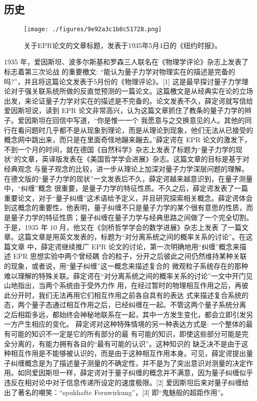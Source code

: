 \subsection{历史}
\begin{figure}[ht]
\centering
\texttt{[image: ./figures/9e92a3c1b8c51728.png]}
\caption{关于EPR论文的文章标题，发表于1935年5月4日的《纽约时报》。} \label{fig_LZJC_2}
\end{figure}
1935 年，爱因斯坦、波多尔斯基和罗森三人联名在《物理学评论》杂志上发表了标志着第三次论战 的重要檄文: “能认为量子力学对物理实在的描述是完备的吗?”，并且将这篇论文发表于5月份的《物理评论》。[1] 这是最早探讨量子力学理论对于强关联系统所做的反直觉预测的一篇论文。这篇檄文是从经典实在论的立场出发，来论证量子力学对实在的描述是不完备的。论文发表不久，薛定谔就写信给爱因斯坦说，读到 EPR 论文非常高兴，认为这篇文章抓住了教条的量子力学的辫子。爱因斯坦在回信中写道，“你是惟一一个 我愿意与之交换意见的人。其他的同行在看问题时几乎都不是从现象到理论，而是从理论到现象，他们无法从已接受的概念网中跳出来，而只是在里面奇怪地蹦来蹦去。”薛定谔在 EPR 论文的激发下，不到一个月的时间，就在德国《自然科学》杂志上发表了标题为“量子力学的现状”的文章，英译版发表在《美国哲学学会进展》杂志。这篇文章的目标是基于对经典观念 与量子观念的比较，进一步从理论上加深对量子力学深层问题的理解。在德文版的“量子力学的现状”一文发表后不久，薛定谔越来越意识到，在量子测量中，“纠缠”概念 很重要，是量子力学的特征性质。不久之后，薛定谔发表了一篇重要论文，对于“量子纠缠”这术语给予定义，并且研究探索相关概念。薛定谔体会到这概念的重要性，他表明，量子纠缠不只是量子力学的某个很有意思的性质，而是量子力学的特征性质；量子纠缠在量子力学与经典思路之间做了一个完全切割。于是，1935 年 10 月，他又在《剑桥哲学学会的数学进展》杂志上发表 了一篇文章。这篇文章是用英文发表的，标题为“对分离系统之间的概率关系的讨论”。在这篇文章 中，薛定谔继续推广 EPR 论文的讨论，第一次明确地用“纠缠”概念来描述 EPR 思想实验中两个曾经耦 合的粒子，分开之后彼此之间仍然维持某种关联的现象，或者说，用“量子纠缠”这一概念来描述复合的 微观粒子系统存在的那种难以理解的特殊关联。薛定谔在“对分离系统之间的概率关系的讨论”一文中开门见山地指出，当两个系统由于受外力作 用，在经过暂时的物理相互作用之后，再彼此分开时，我们无法再用它们相互作用之前各自具有的表达 式来描述复合系统的态，两个量子态通过相互作用之后，已经纠缠在一起。不管这两个量子系统分离 之后相距多远，都始终会神秘地联系在一起，其中一方发生变化，都会立即引发另一方产生相应的变化。 薛定谔对这种特殊情境的另一种表达方式是: 一个整体的最有可能的知识不一定是它的所有部分的最 有可能的知识，即使这些部分可能是完全分离的，有能力拥有各自的“最有可能的认识”。这种知识的 缺乏决不是由于这种相互作用是不能够被认识的，而是由于这种相互作用本身。可见，薛定谔提出量 子纠缠概念是为了描述量子测量的不确定性，并不是为了突出意识对测量的决定作用。如同爱因斯坦一样，薛定谔对于量子纠缠的概念并不满意，因为量子纠缠似乎违反在相对论中对于信息传递所设定的速度极限。[2] 爱因斯坦后来对量子纠缠给出了著名的嘲笑：“spukhafte Fernwirkung”，[3] 即“鬼魅般的超距作用”。

